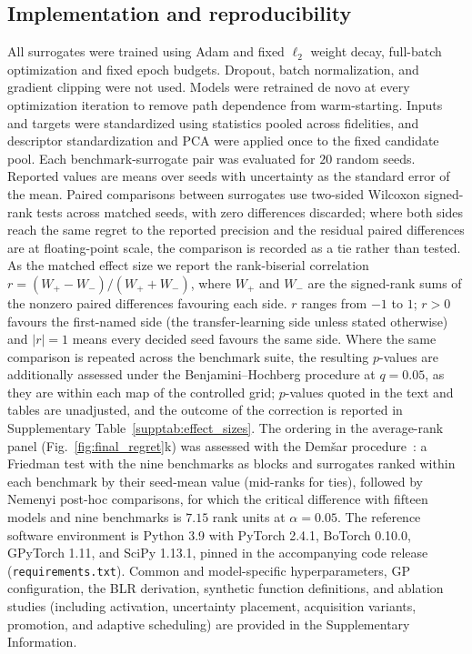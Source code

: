 \documentclass[11pt,a4paper]{article}%
\begin{document}
\subsection{Implementation and reproducibility}\label{sec:meth-impl}

All surrogates were trained using Adam and fixed $\ell_2$ weight decay, full-batch
optimization and fixed epoch budgets. Dropout, batch normalization, and gradient
clipping were not used. Models were retrained de novo at every optimization iteration to remove path dependence
from warm-starting. Inputs and targets were standardized using statistics pooled across
fidelities, and descriptor standardization and PCA were applied
once to the fixed candidate pool. Each benchmark-surrogate pair was evaluated for $20$ random seeds.
Reported values are means over seeds with uncertainty as the standard error of the mean.
Paired comparisons between surrogates use two-sided Wilcoxon signed-rank tests across
matched seeds, with zero differences discarded; where both sides reach the same regret
to the reported precision and the residual paired differences are at floating-point
scale, the comparison is recorded as a tie rather than tested. As the matched effect
size we report
the rank-biserial correlation $r = (W_{+} - W_{-})/(W_{+} + W_{-})$, where $W_{+}$ and
$W_{-}$ are the signed-rank sums of the nonzero paired differences favouring each
side. $r$ ranges from $-1$ to $1$; $r > 0$ favours the first-named side (the
transfer-learning side unless stated otherwise) and $|r| = 1$ means every decided seed
favours the same side. Where the same comparison is repeated across the benchmark
suite, the resulting $p$-values are additionally assessed under the
Benjamini--Hochberg procedure at $q = 0.05$, as they are within each map of the
controlled grid; $p$-values quoted in the text and tables are unadjusted, and the
outcome of the correction is reported in Supplementary
Table~\ref{supptab:effect_sizes}. The ordering in the average-rank panel
(Fig.~\ref{fig:final_regret}k) was assessed with the Dem\v{s}ar
procedure~\citep{demsar2006statistical}: a Friedman test with the nine benchmarks as
blocks and surrogates ranked within each benchmark by their seed-mean value (mid-ranks
for ties), followed by Nemenyi post-hoc comparisons, for which the critical difference
with fifteen models and nine benchmarks is $7.15$ rank units at $\alpha = 0.05$.
The reference software environment is Python 3.9 with PyTorch 2.4.1, BoTorch
0.10.0, GPyTorch 1.11, and SciPy 1.13.1, pinned in the accompanying code
release (\texttt{requirements.txt}).
Common and
model-specific hyperparameters, GP configuration, the
BLR derivation, synthetic function definitions, and
ablation studies (including activation, uncertainty placement, acquisition variants, promotion, and
adaptive scheduling) are provided in the Supplementary Information.
\end{document}
